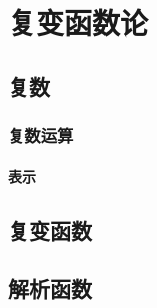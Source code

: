 
\chapter{复变函数论}
\label{chap:complexfunctions}

\section{复数}
\subsection{复数运算}
\subsubsection{表示}

\section{复变函数}

\section{解析函数}


